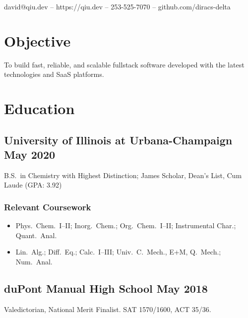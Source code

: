 \documentclass{article}
\makeatletter
\renewcommand{\maketitle}{
	\begin{center}
	{\huge\bfseries\theauthor}

	\vspace{0.5em}
	david@qiu.dev -- https://qiu.dev -- 253-525-7070 -- github.com/diracs-delta
	\end{center}
}
\makeatother
\begin{document}
\author{David Qiu}
\maketitle

\section{Objective}
To build fast, reliable, and scalable fullstack software developed with the
latest technologies and SaaS platforms.

\section{Education}

\subsection{University of Illinois at Urbana-Champaign \hfill May 2020}
B.S.\ in Chemistry with Highest Distinction; James Scholar, Dean's List, Cum Laude (GPA: 3.92)

\subsubsection{Relevant Coursework}

\begin{itemize}[noitemsep,nolistsep]
	\item Phys.\ Chem.\ I--II; Inorg.\ Chem.; Org.\ Chem.\ I--II; Instrumental
		Char.; Quant.\ Anal.

	\item Lin.\ Alg.; Diff.\ Eq.; Calc.\ I--III; Univ.\ C.\ Mech., E+M, Q.\
		Mech.; Num.\ Anal.
\end{itemize}

\subsection{duPont Manual High School \hfill May 2018}
Valedictorian, National Merit Finalist. SAT 1570/1600, ACT 35/36.

\end{document}
